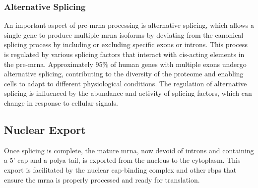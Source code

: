 \subsubsection{Alternative Splicing}
An important aspect of pre-\gls{mrna} processing is alternative splicing, which
allows a single gene to produce multiple \gls{mrna} isoforms by deviating from
the canonical splicing process by including or excluding specific exons or
introns.
This process is regulated by various splicing factors that interact with
cis-acting elements in the
pre-\gls{mrna}\supercite{le_alternative_2015,murphy_therapeutic_2022}.
Approximately 95\% of human genes with multiple exons undergo alternative
splicing, contributing to the diversity of the proteome and enabling cells to
adapt to different physiological conditions\supercite{le_alternative_2015}.
The regulation of alternative splicing is influenced by the abundance and
activity of splicing factors, which can change in response to cellular
signals\supercite{wang_mechanism_2015}.

\subsection{Nuclear Export}
Once splicing is complete, the mature \gls{mrna}, now devoid of introns and
containing a 5' cap and a \gls{polya} tail, is exported from the nucleus to the
cytoplasm.
This export is facilitated by the nuclear cap-binding complex and other
\glspl{rbp} that ensure the \gls{mrna} is properly processed and ready for
translation\supercite{soucek_evolutionarily_2016}.
